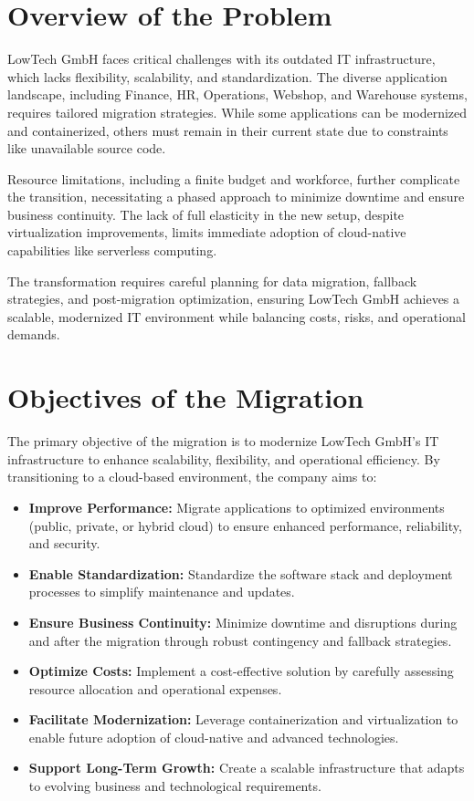 \documentclass{llncs}
\begin{document}
\section{Overview of the Problem}
LowTech GmbH faces critical challenges with its outdated IT infrastructure, which lacks flexibility, scalability, and standardization.
The diverse application landscape, including Finance, HR, Operations, Webshop, and Warehouse systems,
requires tailored migration strategies. While some applications can be modernized and containerized,
others must remain in their current state due to constraints like unavailable source code.

Resource limitations, including a finite budget and workforce, further complicate the transition, necessitating
a phased approach to minimize downtime and ensure business continuity.
The lack of full elasticity in the new setup, despite virtualization improvements, limits immediate adoption
of cloud-native capabilities like serverless computing.

The transformation requires careful planning for data migration, fallback strategies,
and post-migration optimization, ensuring LowTech GmbH achieves a scalable,
modernized IT environment while balancing costs, risks, and operational demands.


\section{Objectives of the Migration}

The primary objective of the migration is to modernize LowTech GmbH's IT infrastructure to enhance scalability, flexibility, and operational efficiency. By transitioning to a cloud-based environment, the company aims to:

\begin{itemize}
    \item \textbf{Improve Performance:} Migrate applications to optimized environments (public, private, or hybrid cloud) to ensure enhanced performance, reliability, and security.
    \item \textbf{Enable Standardization:} Standardize the software stack and deployment processes to simplify maintenance and updates.
    \item \textbf{Ensure Business Continuity:} Minimize downtime and disruptions during and after the migration through robust contingency and fallback strategies.
    \item \textbf{Optimize Costs:} Implement a cost-effective solution by carefully assessing resource allocation and operational expenses.
    \item \textbf{Facilitate Modernization:} Leverage containerization and virtualization to enable future adoption of cloud-native and advanced technologies.
    \item \textbf{Support Long-Term Growth:} Create a scalable infrastructure that adapts to evolving business and technological requirements.
\end{itemize}
\end{document}

